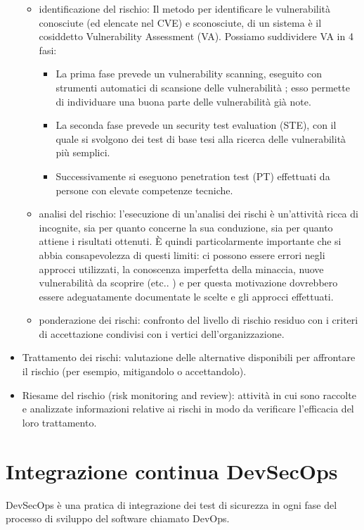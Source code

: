 \begin{itemize}
        \begin{itemize}
            \item identificazione del rischio: Il metodo per identificare le vulnerabilità conosciute (ed elencate nel CVE) e sconosciute, di un sistema è il cosiddetto Vulnerability Assessment (VA).  Possiamo suddividere VA in 4 fasi:
                \begin{itemize}
                    \item La prima fase prevede un vulnerability scanning, eseguito con strumenti automatici di scansione delle vulnerabilità ; esso permette di individuare una buona parte delle vulnerabilità già note.
                    \item La seconda fase prevede un security test evaluation (STE), con il quale si svolgono dei test di base tesi alla ricerca delle vulnerabilità più semplici.
                    \item Successivamente si eseguono penetration test (PT) effettuati da persone con elevate competenze tecniche.
                \end{itemize}
            \item analisi del rischio:  l’esecuzione di un’analisi dei rischi è un’attività ricca di incognite, sia per quanto concerne la sua conduzione, sia per quanto attiene i risultati ottenuti. È quindi particolarmente importante che si abbia consapevolezza di questi limiti: ci possono essere errori negli approcci utilizzati, la conoscenza imperfetta della minaccia, nuove vulnerabilità da scoprire (etc.. ) e per questa motivazione dovrebbero essere adeguatamente documentate le scelte e gli approcci effettuati.
            \item ponderazione dei rischi: confronto del livello di rischio residuo con i criteri di accettazione condivisi con i vertici dell’organizzazione.
        \end{itemize}
    \item Trattamento dei rischi: valutazione delle alternative disponibili per affrontare il rischio (per esempio, mitigandolo o accettandolo).
    \item Riesame del rischio (risk monitoring and review):  attività in cui sono raccolte e analizzate informazioni relative ai rischi in modo da verificare l’efficacia del loro trattamento. 
\end{itemize}
\section{Integrazione continua DevSecOps}
DevSecOps è una pratica di integrazione dei test di sicurezza in ogni fase del processo di sviluppo del software chiamato DevOps. 

